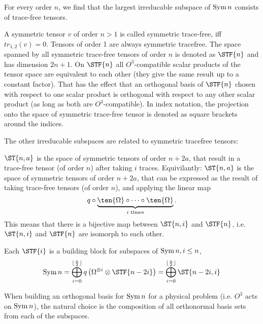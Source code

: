 {\begin{example}
	For every order $n$, we find that the largest irreducable subspace of $\operatorname{Sym}{n}$ consists of trace-free tensors.
	\begin{definition}
		A symmetric tensor $v$ of order $n>1$ is called symmetric trace-free, iff $tr_{1,2}(v)=0$. Tensors of order 1 are always symmetric tracefree.
		The space spanned by all symmetric trace-free tensors of order $n$ is denoted as $\STF{n}$ and has dimension $2n+1$. On $\STF{n}$ all $O^3$-compatible scalar products of the tensor space are equivalent to each other (they give the same result up to a constant factor). That has the effect that an orthogonal basis of $\STF{n}$ chosen with respect to one scalar product is orthogonal with respect to any other scalar product (as long as both are $O^3$-compatible). In index notation, the projection onto the space of symmetric trace-free tensor is denoted as square brackets around the indices.
	\end{definition}
	The other irreducable subspaces are related to symmetric tracefree tensors:
	\begin{definition}
		$\ST{n,a}$ is the space of symmetric tensors of order $n+2a$, that result in a trace-free tensor (of order $n$) after taking $i$ traces. Equivilantly: $\ST{n,a}$ is the space of symmetric tensors of order $n+2a$, that can be expressed as the result of taking trace-free tensors (of order $n$), and applying the linear map
		\[q\circ \underbrace{\ten{\Omega}\circ \cdots \circ \ten{\Omega}}_{i \text{ times}}.\]
		This means that there is a bijective map between $\ST{n,i}$ and $\STF{n}$, i.e. $\ST{n,i}$ and $\STF{n}$ are isomorph to each other.
	\end{definition}
	
	\begin{lemma}
		Each $\STF{i}$ is a building block for subspaces of $\operatorname{Sym}{n}, i\leq n$,
		\[\Sym{n} = \bigoplus_{i=0}^{\lfloor\frac{n}{2}\rfloor} q\left(\Omega^{\otimes i}\otimes \STF{n-2i}\right)=\bigoplus_{i=0}^{\lfloor\frac{n}{2}\rfloor}\ST{n-2i,i}\]
		
	\end{lemma}
	
	When building an orthogonal basis for $\operatorname{Sym}{n}$ for a physical problem (i.e. $O^3$ acts on $\operatorname{Sym}{n}$), the natural choice is the composition of all orthonormal basis sets from each of the subspaces. 
	
\end{example}

}
